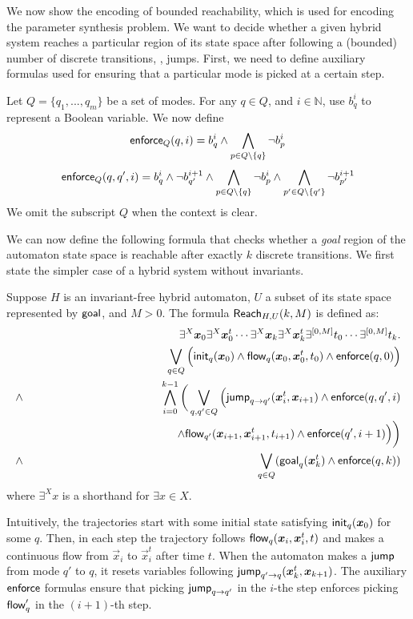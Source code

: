 We now show the encoding of bounded reachability, which is used for encoding the parameter synthesis
problem. We want to decide whether a given 
hybrid system reaches a particular region of its state space after following a (bounded) number
of discrete transitions, \ie, jumps. First, we need to define auxiliary formulas used
for ensuring that a particular mode is picked at a certain step.
\begin{definition}
Let $Q = \{q_1,...,q_m\}$ be a set of modes. For any $q\in Q$, and $i\in\mathbb{N}$, use  $b_{q}^i$ to represent a Boolean variable. We now define
$$\mathsf{enforce}_Q(q,i) = b^i_{q} \wedge \bigwedge_{p\in Q\setminus\{q\}}\neg b^{i}_{p}$$
$$\mathsf{enforce}_Q(q, q',i) = b^{i}_{q}\wedge \neg b^{i+1}_{q'} \wedge \bigwedge_{p\in Q\setminus\{q\}} \neg b^i_{p} \wedge \bigwedge_{p'\in Q\setminus\{q'\}} \neg b^{i+1}_{p'}$$
We omit the subscript $Q$ when the context is clear.\end{definition}

We can now define the following formula that checks whether a {\em goal} region of the automaton
state space is reachable after exactly $k$ discrete transitions. We first state 
the simpler case of a hybrid system without invariants.
\begin{definition}
Suppose $H$ is an invariant-free hybrid automaton, $U$ a subset of its state space represented by $\mathsf{goal}$,
and $M>0$. The formula $\mathsf{Reach}_{H,U}(k,M)$ is defined as:
\begin{eqnarray*}
& &\exists^X \vec x_{0} \exists^X\vec x_{0}^t\cdots \exists^X \vec x_{k}\exists^X\vec x_{k}^t\exists^{[0,M]}t_0\cdots \exists^{[0,M]}t_k.\\
& &\bigvee_{q\in Q} \Big(\init_{q}(\vec x_{0})\wedge \flow_{q}(\vec x_{0}, \vec x_{0}^t, t_0)\wedge \enforce(q,0)\Big)\\%
\wedge & & \bigwedge_{i=0}^{k-1}\bigg( \bigvee_{q, q'\in Q} \Big(\jump_{q\rightarrow q'}(\vec x_{i}^t, \vec x_{i+1})\wedge \enforce(q,q',i)\\
& & \hspace{4.5cm}\wedge\flow_{q'}(\vec x_{i+1}, \vec x_{i+1}^t, t_{i+1})\wedge \enforce(q',i+1)\Big)\bigg)\\
\wedge & &\bigvee_{q\in Q} (\goal_q(\vec x_{k}^t)\wedge \enforce(q,k))
\end{eqnarray*}
where $\exists^X x$ is a shorthand for $\exists x\in X$.
\end{definition}
Intuitively, the trajectories start with some initial state satisfying $\init_q(\vec x_{0})$ for some $q$. 
Then, in each step the trajectory follows $\flow_q(\vec x_{i}, \vec x_{i}^t, t)$ and makes a continuous flow from $\vec x_i$ to $\vec x_i^t$ after time $t$. When the automaton makes a $\mathsf{jump}$ from mode $q'$ to $q$, it resets variables following $\jump_{q'\rightarrow q}(\vec x_{k}^t, \vec x_{k+1})$. The auxiliary $\mathsf{enforce}$ formulas ensure that picking $\mathsf{jump}_{q\rightarrow q'}$ in the $i$-the step enforces picking $\mathsf{flow}_q'$ in the $(i+1)$-th step.

